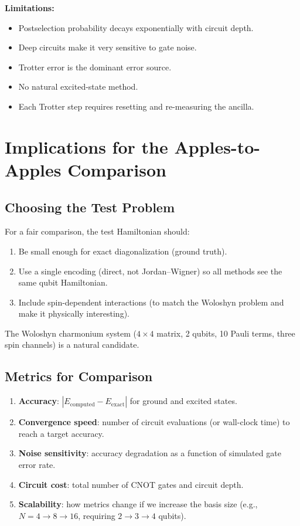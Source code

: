 \documentclass[11pt,a4paper]{article}
\begin{document}
\textbf{Limitations:}
\begin{itemize}[nosep]
  \item Postselection probability decays exponentially with circuit depth.
  \item Deep circuits make it very sensitive to gate noise.
  \item Trotter error is the dominant error source.
  \item No natural excited-state method.
  \item Each Trotter step requires resetting and re-measuring the ancilla.
\end{itemize}


\section{Implications for the Apples-to-Apples Comparison}
\label{sec:implications}

\subsection{Choosing the Test Problem}

For a fair comparison, the test Hamiltonian should:
\begin{enumerate}[nosep]
  \item Be small enough for exact diagonalization (ground truth).
  \item Use a single encoding (direct, not Jordan--Wigner) so all methods
    see the same qubit Hamiltonian.
  \item Include spin-dependent interactions (to match the Woloshyn problem
    and make it physically interesting).
\end{enumerate}

The Woloshyn charmonium system ($4 \times 4$ matrix, 2 qubits, 10 Pauli
terms, three spin channels) is a natural candidate.

\subsection{Metrics for Comparison}

\begin{enumerate}[nosep]
  \item \textbf{Accuracy}: $|E_{\text{computed}} - E_{\text{exact}}|$
    for ground and excited states.
  \item \textbf{Convergence speed}: number of circuit evaluations (or
    wall-clock time) to reach a target accuracy.
  \item \textbf{Noise sensitivity}: accuracy degradation as a function of
    simulated gate error rate.
  \item \textbf{Circuit cost}: total number of CNOT gates and circuit depth.
  \item \textbf{Scalability}: how metrics change if we increase the basis
    size (e.g., $N=4 \to 8 \to 16$, requiring $2 \to 3 \to 4$ qubits).
\end{enumerate}
\end{document}
